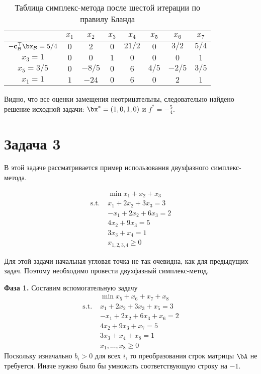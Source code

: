 \documentclass[12pt]{article}
\begin{document}
\begin{table}[!ht]
\centering
\caption{Таблица симплекс-метода после шестой итерации по правилу Бланда}
\begin{tabular}{|c|ccccccc|}
\hline
& $x_1$ & $x_2$ & $x_3$ & $x_4$ & $x_5$ & $x_6$ & $x_7$\\
\hline
$-\mathbf{c}_{\mathcal{B}}^{\top}\bx_{\mathcal{B}} = 5/4$ & $0$ & $2$ & $0$ & $21/2$ & $0$ & $3/2$ & $5/4$ \\
\hline
$x_3 = 1$ & $0$ & $0$ & $1$ & $0$ & $0$ & $0$ & $1$ \\
$x_5 = 3/5$ & $0$ & $-8/5$ & $0$ & $6$ & $4/5$ & $-2/5$ & $3/5$ \\
$x_1 = 1$ & $1$ & $-24$ & $0$ & $6$ & $0$ & $2$ & $1$ \\
\hline
\end{tabular}
\label{tab::simplex_26_2}
\end{table}

Видно, что все оценки замещения неотрицательны, следовательно найдено решение исходной задачи: $\bx^* = (1, 0, 1, 0)$ и $f^* = -\frac{5}{4}$.


\section{Задача 3}
В этой задаче рассматривается пример использования двухфазного симплекс-метода.

\begin{equation*}
\begin{split}
& \min x_1 + x_2 + x_3\\
\text{s.t. } & x_1 + 2x_2 + 3x_3 = 3\\
& -x_1 + 2x_2 + 6x_3 = 2\\
& 4x_2 + 9x_3 = 5\\
& 3x_3 + x_4 = 1\\
& x_{1,2,3,4} \geq 0
\end{split}
\end{equation*}

Для этой задачи начальная угловая точка не так очевидна, как для предыдущих задач. 
Поэтому необходимо провести двухфазный симплекс-метод.
 
\textbf{Фаза 1.} Составим вспомогательную задачу
\begin{equation*}
\begin{split}
& \min x_5 + x_6 + x_7 + x_8\\
\text{s.t. } & x_1 + 2x_2 + 3x_3 + x_5 = 3\\
& -x_1 + 2x_2 + 6x_3 + x_6 = 2\\
& 4x_2 + 9x_3 + x_7 = 5\\
& 3x_3 + x_4 + x_8 = 1\\
& x_1, \dots,x_8 \geq 0
\end{split}
\end{equation*}
Поскольку изначально $b_i > 0$ для всех $i$, то преобразования строк матрицы $\bA$ не требуется. 
Иначе нужно было бы умножить соответствующую строку на $-1$.
\end{document}
